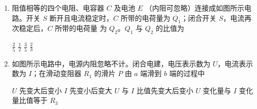 \begin{enumerate}
\item 
{}
阻值相等的四个电阻、电容器 $ C $ 及电池 $ E $
（内阻可忽略）连接成如图所示电路。开关 $ S $ 断开且电流稳定时，$ C $
所带的电荷量为 $ Q_{1} $；闭合开关 $ S $，电流再次稳定后，$ C $ 所带的电荷量
为 $ Q_{2} $。$ Q_{1} $ 与 $ Q_{2} $ 的比值为  
\begin{figure}[h!]
\centering

\end{figure}

\fourchoices
{$ \frac{ 2 }{ 5 } $}
{$ \frac{ 1 }{ 2 } $}
{$ \frac{ 3 }{ 5 } $}
{$ \frac{ 2 }{ 3 } $}





\item 
{}
如图所示电路中，电源内阻忽略不计。闭合电建，电压表示数为 $ U $，电流表示
数为 $ I $；在滑动变阻器 $ R_{1} $ 的滑片 $ P $ 由 $ a $ 端滑到 $ b $ 端的过程中  
\begin{figure}[h!]
\centering

\end{figure}

\fourchoices
{$ U $ 先变大后变小}
{$ I $ 先变小后变大}
{$ U $ 与 $ I $ 比值先变大后变小}
{$ U $ 变化量与 $ I $ 变化量比值等于 $ R_{3} $}






\end{enumerate}

